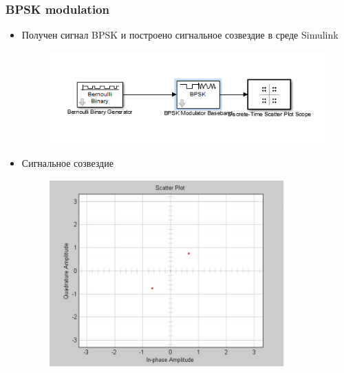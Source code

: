 \documentclass[10pt,a4paper]{article}
\begin{document}
\subsubsection{BPSK modulation}
\begin{itemize}
\item Получен сигнал BPSK и построено сигнальное созвездие в среде Simulink
\begin{figure}[h]
\centering
\includegraphics[width=11cm]{sim1_1.png} 
\end{figure}
\item Сигнальное созвездие
\begin{figure}[h]
\centering
\includegraphics[width=9cm]{sim1.png} 
\end{figure}
\end{itemize}
\newpage
\FloatBarrier
\end{document}
